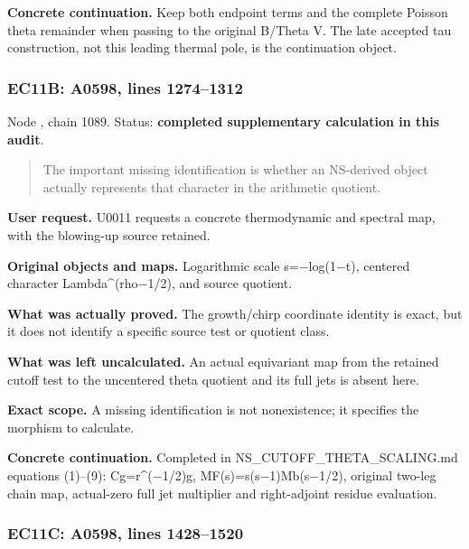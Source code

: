 \documentclass[10pt,a4paper,oneside]{report}
\begin{document}
\textbf{Concrete continuation.} Keep both endpoint terms and the
complete Poisson theta remainder when passing to the original B/Theta V.
The late accepted tau construction, not this leading thermal pole, is
the continuation object.

\subsubsection{EC11B: A0598, lines
1274--1312}\label{ec11b-a0598-lines-12741312}

Node \protect{}, chain 1089.
Status: \textbf{completed supplementary calculation in this audit}.

\begin{quote}
The important missing identification is whether an NS-derived object
actually represents that character in the arithmetic quotient.
\end{quote}

\textbf{User request.} U0011 requests a concrete thermodynamic and
spectral map, with the blowing-up source retained.

\textbf{Original objects and maps.} Logarithmic scale
s=\allowbreak{}\ensuremath{−}\allowbreak{}log(1\allowbreak{}\ensuremath{−}\allowbreak{}t),
centered character
Lambda\textasciicircum{}(rho\allowbreak{}\ensuremath{−}\allowbreak{}1/2),
and source quotient.

\textbf{What was actually proved.} The growth/chirp coordinate identity
is exact, but it does not identify a specific source test or quotient
class.

\textbf{What was left uncalculated.} An actual equivariant map from the
retained cutoff test to the uncentered theta quotient and its full jets
is absent here.

\textbf{Exact scope.} A missing identification is not nonexistence; it
specifies the morphism to calculate.

\textbf{Concrete continuation.} Completed in
NS\_CUTOFF\_THETA\_SCALING.md equations (1)--(9):
Cg=r\textasciicircum{}(\allowbreak{}\ensuremath{−}\allowbreak{}1/2)g,
MF(s)=s(s\allowbreak{}\ensuremath{−}\allowbreak{}1)Mb(s\allowbreak{}\ensuremath{−}\allowbreak{}1/2),
original two-leg chain map, actual-zero full jet multiplier and
right-adjoint residue evaluation.

\subsubsection{EC11C: A0598, lines
1428--1520}\label{ec11c-a0598-lines-14281520}
\end{document}
